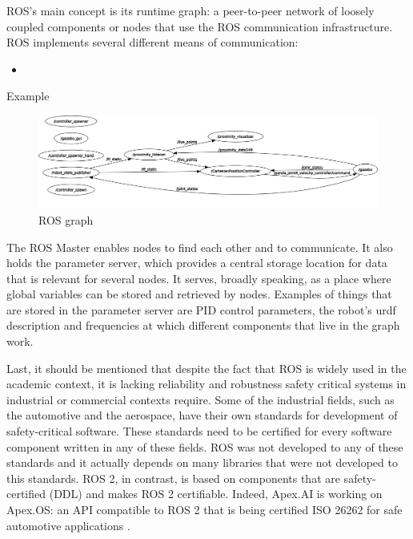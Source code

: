ROS’s main concept is its runtime graph: a peer-to-peer network of loosely coupled components or nodes that use the ROS communication infrastructure. ROS implements several different means of communication:

\begin{itemize}
    \item
\end{itemize}

Example

\begin{figure}[htbp]
    \caption[ROS graph]{
        ROS graph
    }
    \begin{center}
    \includegraphics[width=165mm]{figs/rosgraph.png}
    \end{center}
\label{fig:rosgraph}
\end{figure}

The ROS Master enables nodes to find each other and to communicate. It also holds the parameter server, which provides a central storage location for data that is relevant for several nodes. It serves, broadly speaking, as a place where global variables can be stored and retrieved by nodes. Examples of things that are stored in the parameter server are PID control parameters, the robot’s urdf description and frequencies at which different components that live in the graph work.

Last, it should be mentioned that despite the fact that ROS is widely used in the academic context, it is lacking reliability and robustness safety critical systems in industrial or commercial contexts require. Some of the industrial fields, such as the automotive and the aerospace, have their own standards for development of safety-critical software. These standards need to be certified for every software component written in any of these fields. ROS was not developed to any of these standards and it actually depends on many libraries that were not developed to this standards. ROS 2, in contrast, is based on components that are safety-certified (DDL) and makes ROS 2 certifiable. Indeed, Apex.AI is working on Apex.OS: an API compatible to ROS 2 that is being certified ISO 26262 for safe automotive applications \cite{apexOS}.

